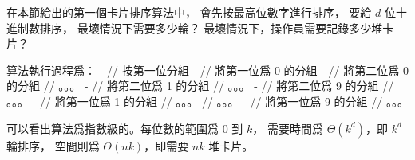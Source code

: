 \startEXERCISE\DIFFICULT
在本節給出的第一個卡片排序算法中，
會先按最高位數字進行排序，
要給 $d$ 位十進制數排序，
最壞情況下需要多少輪？
最壞情況下，操作員需要記錄多少堆卡片？
\stopEXERCISE

\startANSWER
算法執行過程爲：
\startCLRSCODE
- // 按第一位分組
	- // 將第一位爲 0 的分組
		- // 將第二位爲 0 的分組
      			// 。。。
    		- // 將第二位爲 1 的分組
      			// 。。。
    		- // 將第二位爲 9 的分組
      			// 。。。
  	- // 將第一位爲 1 的分組
    		// 。。。
    	// 。。。
  	- // 將第一位爲 9 的分組
    		// 。。。
\stopCLRSCODE

可以看出算法爲指數級的。每位數的範圍爲 $0$ 到 $k$，
需要時間爲 $\Theta(k^d)$，即 $k^d$ 輪排序，
空間則爲 $\Theta(nk)$，即需要 $nk$ 堆卡片。
\stopANSWER
